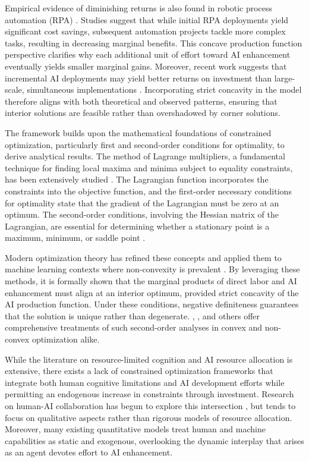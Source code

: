 Empirical evidence of diminishing returns is also found in robotic process automation (RPA) \citep{syed2020robotic}. Studies suggest that while initial RPA deployments yield significant cost savings, subsequent automation projects tackle more complex tasks, resulting in decreasing marginal benefits. This concave production function perspective clarifies why each additional unit of effort toward AI enhancement eventually yields smaller marginal gains. Moreover, recent work suggests that incremental AI deployments may yield better returns on investment than large-scale, simultaneous implementations \citep{davenport2018artificial}. Incorporating strict concavity in the model therefore aligns with both theoretical and observed patterns, ensuring that interior solutions are feasible rather than overshadowed by corner solutions.

The framework builds upon the mathematical foundations of constrained optimization, particularly first and second-order conditions for optimality, to derive analytical results. The method of Lagrange multipliers, a fundamental technique for finding local maxima and minima subject to equality constraints, has been extensively studied \citep{flaam2008slopes,jie2021computing}. The Lagrangian function incorporates the constraints into the objective function, and the first-order necessary conditions for optimality state that the gradient of the Lagrangian must be zero at an optimum. The second-order conditions, involving the Hessian matrix of the Lagrangian, are essential for determining whether a stationary point is a maximum, minimum, or saddle point \citep{hallak2020finding}.

Modern optimization theory has refined these concepts and applied them to machine learning contexts where non-convexity is prevalent \citep{dauphin2014identifying}. By leveraging these methods, it is formally shown that the marginal products of direct labor and AI enhancement must align at an interior optimum, provided strict concavity of the AI production function. Under these conditions, negative definiteness guarantees that the solution is unique rather than degenerate. \cite{sekeris2024conflict}, \cite{dehm2023non}, and others offer comprehensive treatments of such second-order analyses in convex and non-convex optimization alike.

While the literature on resource-limited cognition \citep{norman1975data,kahneman1973attention} and AI resource allocation \citep{snoek2012practical, gu2022ai} is extensive, there exists a lack of constrained optimization frameworks that integrate both human cognitive limitations and AI development efforts while permitting an endogenous increase in constraints through investment. Research on human-AI collaboration has begun to explore this intersection \citep{cappelli2023artificial,westby2023collective}, but tends to focus on qualitative aspects rather than rigorous models of resource allocation. Moreover, many existing quantitative models treat human and machine capabilities as static and exogenous, overlooking the dynamic interplay that arises as an agent devotes effort to AI enhancement.

